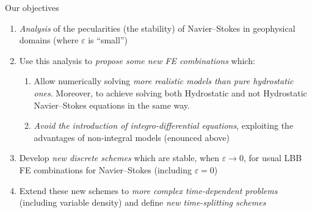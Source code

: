 \begin{frame}{Our objectives}
\begin{enumerate}\itemsep0.66em
\item \textit{Analysis} of the pecularities (the stability) of
  Navier--Stokes in geophysical domains (where $\varepsilon$ is ``small'')
\item Use this analysis to \textit{propose some new FE
    combinations} which:%
  \begin{enumerate}\itemsep0.33em
  \item Allow numerically solving \textit{more realistic models than pure hydrostatic
      ones}. Moreover, to achieve solving both Hydrostatic and not
    Hydrostatic Navier--Stokes equations in the same way.
  \item \textit{Avoid the introduction of integro-differential equations},
    exploiting the advantages of non-integral models (enounced above)
  \end{enumerate}
\item Develop \textit{new discrete schemes} which are
  stable, when $\varepsilon\to 0$, for usual LBB FE combinations for
  Navier--Stokes (including $\varepsilon=0$)
\item Extend these new schemes to \textit{more complex time-dependent
    problems} (including variable density) and define \textit{new
  time-splitting schemes}
\end{enumerate}
\end{frame}


